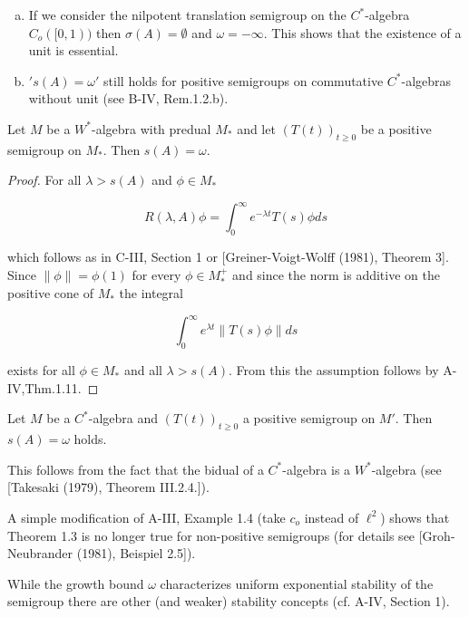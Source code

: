 \newpage


\begin{remark}\label{rem:d4-1-2}
\begin{enumerate}[(a)]
\item
If we consider the nilpotent translation semigroup on the $C^*$-algebra $C_{o}([0,1))$ then $\sigma(A) = \emptyset$ and $\omega = -\infty$.
This shows that the existence of a unit is essential.

\item
$'s(A) = \omega'$ still holds for positive semigroups on commutative $C^*$-algebras without unit (see B-IV, Rem.1.2.b).
\end{enumerate}
\end{remark}

\begin{theorem}\label{thm:d4-1-3}
Let $M$ be a $W^*$-algebra with predual $M_{*}$ and let $(T(t))_{t \geq 0}$ be a positive semigroup on $M_{*}$.
Then $s(A) = \omega$.
\end{theorem}

\begin{proof}
For all $\lambda > s(A)$ and $\phi \in M_{*}$

\[
R(\lambda,A)\phi = \int_{0}^{\infty} e^{-\lambda t}T(s)\phi ds
\]

which follows as in C-III, Section 1 or [Greiner-Voigt-Wolff (1981), Theorem 3].
Since $\|\phi\| = \phi(1)$ for every $\phi \in M_{*}^{+}$ and since the norm is additive on the positive cone of $M_{*}$ the integral

\[
\int_{0}^{\infty} e^{\lambda t}\|T(s)\phi\|ds
\]

exists for all $\phi \in M_{*}$ and all $\lambda > s(A)$.
From this the assumption follows by A-IV,Thm.1.11.
\end{proof}

\begin{corollary}\label{cor:d4-1-4}
Let $M$ be a $C^*$-algebra and $(T(t))_{t \geq 0}$ a positive semigroup on $M'$.
Then $s(A) = \omega$ holds.
\end{corollary}

This follows from the fact that the bidual of a $C^*$-algebra is a $W^*$-algebra (see [Takesaki (1979), Theorem III.2.4.]).

\begin{remark}\label{rem:d4-1-5}
A simple modification of A-III, Example 1.4 (take $c_{o}$ instead of $\ell^2$) shows that Theorem 1.3 is no longer true for non-positive semigroups (for details see [Groh-Neubrander (1981), Beispiel 2.5]).

While the growth bound $\omega$ characterizes uniform exponential stability of the semigroup there are other (and weaker) stability concepts (cf. A-IV, Section 1).
\end{remark}

